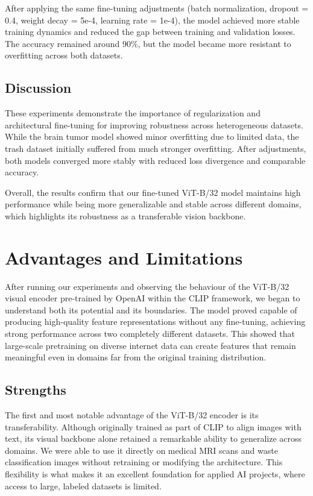 \documentclass[12pt]{article}
\begin{document}
After applying the same fine-tuning adjustments (batch normalization, dropout = 0.4, weight decay = 5e-4, learning rate = 1e-4), 
the model achieved more stable training dynamics and reduced the gap between training and validation losses. 
The accuracy remained around 90\%, but the model became more resistant to overfitting across both datasets.


\subsection{Discussion}

These experiments demonstrate the importance of regularization and architectural fine-tuning for improving robustness across heterogeneous datasets. 
While the brain tumor model showed minor overfitting due to limited data, 
the trash dataset initially suffered from much stronger overfitting. 
After adjustments, both models converged more stably with reduced loss divergence and comparable accuracy.

Overall, the results confirm that our fine-tuned ViT-B/32 model maintains high performance 
while being more generalizable and stable across different domains, 
which highlights its robustness as a transferable vision backbone.



\section{Advantages and Limitations}

After running our experiments and observing the behaviour of the ViT-B/32 visual encoder pre-trained by OpenAI within the CLIP framework, we began to understand both its potential and its boundaries. The model proved capable of producing high-quality feature representations without any fine-tuning, achieving strong performance across two completely different datasets. This showed that large-scale pretraining on diverse internet data can create features that remain meaningful even in domains far from the original training distribution.

\subsection{Strengths}
The first and most notable advantage of the ViT-B/32 encoder is its transferability. Although originally trained as part of CLIP to align images with text, its visual backbone alone retained a remarkable ability to generalize across domains. We were able to use it directly on medical MRI scans and waste classification images without retraining or modifying the architecture. This flexibility is what makes it an excellent foundation for applied AI projects, where access to large, labeled datasets is limited.
\end{document}
